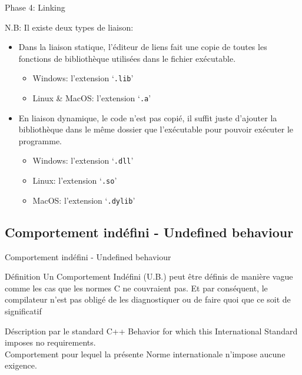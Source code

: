 \documentclass{beamer}
\begin{document}
\begin{darkframes}
	\begin{frame}{Phase 4: Linking}
		\begin{alertblock}{N.B:}
			Il existe deux types de liaison:
			\begin{itemize}
				\item Dans la \alert{liaison statique}, l'éditeur de liens fait une copie de toutes les fonctions de bibliothèque utilisées dans le fichier exécutable.
				\begin{itemize}
					\item Windows: l'extension `\texttt{.lib}'
					\item Linux \& MacOS: l'extension `\texttt{.a}'
				\end{itemize}
				\item En \alert{liaison dynamique}, le code n'est pas copié, il suffit juste d'ajouter la bibliothèque dans le même dossier que l'exécutable pour pouvoir exécuter le programme.
				\begin{itemize}
					\item Windows: l'extension `\texttt{.dll}'
					\item Linux: l'extension `\texttt{.so}'
					\item MacOS: l'extension `\texttt{.dylib}'
				\end{itemize}
			\end{itemize}
		\end{alertblock}
	\end{frame}

	\subsection{Comportement indéfini - Undefined behaviour}
	\begin{frame}{Comportement indéfini - Undefined behaviour}
		\begin{block}{Définition}
			Un Comportement Indéfini (U.B.) peut être définis de manière vague comme les cas que les normes C ne couvraient pas. Et par conséquent, le compilateur n'est pas obligé de les diagnostiquer ou de faire quoi que ce soit de significatif
		\end{block}
		\begin{block}{Déscription par le standard C++}
			Behavior for which this International Standard imposes no requirements. \\
			Comportement pour lequel la présente Norme internationale n'impose aucune exigence.
		\end{block}
	\end{frame}
	

\end{darkframes}
\end{document}

